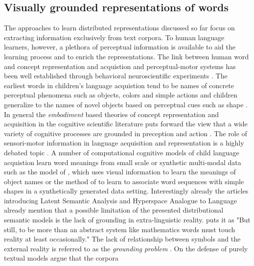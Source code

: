 \subsection{Visually grounded representations of words}
\label{sec:visualwords}
The approaches to learn distributed representations discussed so far focus on extracting information exclusively
from text corpora. To human language learners, however, a plethora of perceptual information is available to aid the
learning process and to enrich the representations. The link between human word and concept representation and acquistion
and perceptual-motor systems has been well established through behavioral neuroscientific experiments \cite{pulvermuller2005brain}.
The earliest words in children's language acquistion tend to be names of concrete perceptual phenomena
such as objects, colors and simple actions \cite{bornstein2004cross} and children generalize to the names
of novel objects based on perceptual cues such as shape \cite{landau1998object}.
In general the \emph{embodiment} based theories of concept representation and acquisition in the
cognitive scientific literature puts forward the view that a wide variety of cognitive processes
are grounded in preception and action \cite{meteyard2008role}. The role of sensori-motor information in
language acquisition and representation is a highly debated topic \cite{meteyard2012coming}.
A number of
computational cognitive models of child language acquistion learn word meanings from small scale or synthetic
multi-modal data such as the model of \cite{yu2005emergence}, which uses visual information to learn the meanings of object
names or the method of \cite{roy2002learning} to learn to associate word sequences with simple shapes in a synthetically
generated data setting.
Interestingly already the articles introducing Latent Semantic Analysis
\cite{landauer1997solution} and Hyperspace Analogue to Language \cite{lund1996producing} already mention that a possible
limitation of the presented distributional semantic models is the lack of grounding in extra-linguistic reality.
\cite{landauer1997solution} puts it as "But still, to be more than an abstract system like mathematics words must
touch reality at least occasionally." The lack of relationship between symbols and the external reality is referred
to as the \emph{grounding problem} \cite{harnad1990symbol,perfetti1998limits}.
On the defense of purely textual models \cite{louwerse2011symbol} argue that the corpora
